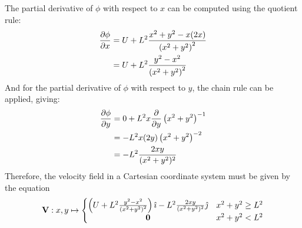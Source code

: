 The partial derivative of $\phi$ with respect to $x$ can be computed using the quotient rule:
\begin{align*}
    \pdv{\phi}{x}&=U+L^2\frac{x^2+y^2-x(2x)}{\left(x^2+y^2\right)^2}\\
    &=U+L^2\frac{y^2-x^2}{\left(x^2+y^2\right)^2}
\end{align*}
And for the partial derivative of $\phi$ with respect to $y$, the chain rule can be applied, giving:
\begin{align*}
    \pdv{\phi}{y}&=0+L^2x\pdv{y}\left(x^2+y^2\right)^{-1}\\
    &=-L^2x(2y)\left(x^2+y^2\right)^{-2}\\
    &=-L^2\frac{2xy}{(x^2+y^2)^2}
\end{align*}
Therefore, the velocity field in a Cartesian coordinate system must be given by the equation
$$
    \mathbf{V}:x,y\mapsto\left\{\begin{matrix}
        \left(U+L^2\frac{y^2-x^2}{\left(x^2+y^2\right)^2}\right)\hat{\imath}-L^2\frac{2xy}{(x^2+y^2)^2}\hat{\jmath}&x^2+y^2\geq L^2\\
        \mathbf{0}&x^2+y^2<L^2
    \end{matrix}\right.
$$

